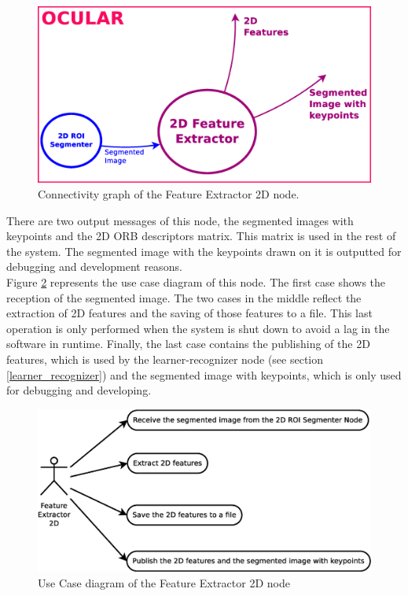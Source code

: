 		\begin{figure}[H]
			\begin{center}
			\includegraphics[width=0.5\linewidth]{img/diagrams/node_fe2d.eps}
			\caption[Feature Extractor 2D node I/O]{Connectivity graph of the Feature Extractor 2D node.}		
			\label{node_fe2d}
			\end{center}
		\end{figure}

	There are two output messages of this node, the segmented images with keypoints and the 2D ORB descriptors matrix. 
	This matrix is used in the rest of the system. 
	The segmented image with the keypoints drawn on it is outputted for debugging and development reasons. 
	\\

	Figure  \ref{uc_fe2d} represents the use case diagram of this node. 
	The first case shows the reception of the segmented image. 
	The two cases in the middle reflect the extraction of 2D features and the saving of those features to a file. 
	This last operation is only performed when the system is shut down to avoid a lag in the software in runtime. 
	Finally, the last case contains the publishing of the 2D features, which is used by the learner-recognizer node (see section \ref{learner_recognizer}) and the segmented image with keypoints, which is only used for debugging and developing. 
	\begin{figure}[H]
		\centering
			\includegraphics[scale=0.4]{img/diagrams/uc_feature_extractor_2d.eps}
			\caption[Use case diagram Feature Extractor 2D node]{Use Case diagram of the Feature Extractor 2D node}
		\label{uc_fe2d}
	\end{figure}

